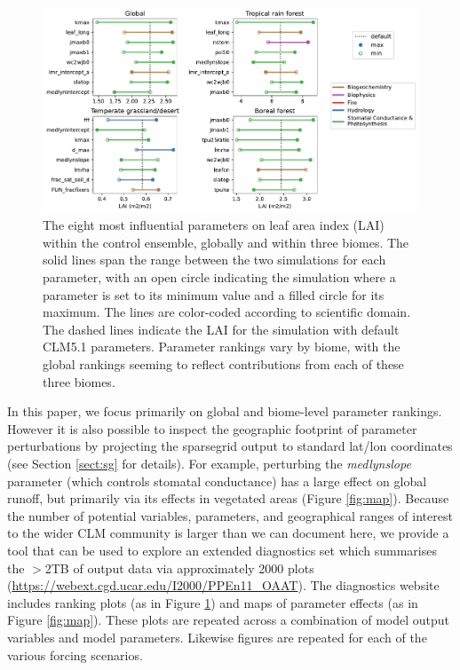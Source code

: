 \documentclass[draft]{agujournal2019}
\begin{document}
\begin{figure}[h]
\centering
\includegraphics[width=\textwidth]{../figs/lai_biome.pdf}
\caption{The eight most influential parameters on leaf area index (LAI) within the control ensemble, globally and within three biomes. The solid lines span the range between the two simulations for each parameter, with an open circle indicating the simulation where a parameter is set to its minimum value and a filled circle for its maximum. The lines are color-coded according to scientific domain. The dashed lines indicate the LAI for the simulation with default CLM5.1 parameters. Parameter rankings vary by biome, with the global rankings seeming to reflect contributions from each of these three biomes.}
\label{fig:lai}
\end{figure}

In this paper, we focus primarily on global and biome-level parameter rankings. However it is also possible to inspect the geographic footprint of parameter perturbations by projecting the sparsegrid output to standard lat/lon coordinates (see Section \ref{sect:sg} for details). For example, perturbing the \textit{medlynslope} parameter (which controls stomatal conductance) has a large effect on global runoff, but primarily via its effects in vegetated areas (Figure \ref{fig:map}). 
Because the number of potential variables, parameters, and geographical ranges of interest to the wider CLM community is larger than we can document here,  we provide a tool that can be used to explore an extended diagnostics set which summarises the $>$2TB of output data via approximately 2000 plots (\url{https://webext.cgd.ucar.edu/I2000/PPEn11_OAAT}). The diagnostics website includes ranking plots (as in Figure \ref{fig:lai}) and maps of parameter effects (as in Figure \ref{fig:map}). These plots are repeated across a combination of model output variables and model parameters. Likewise figures are repeated for each of the various forcing scenarios. 
\end{document}

